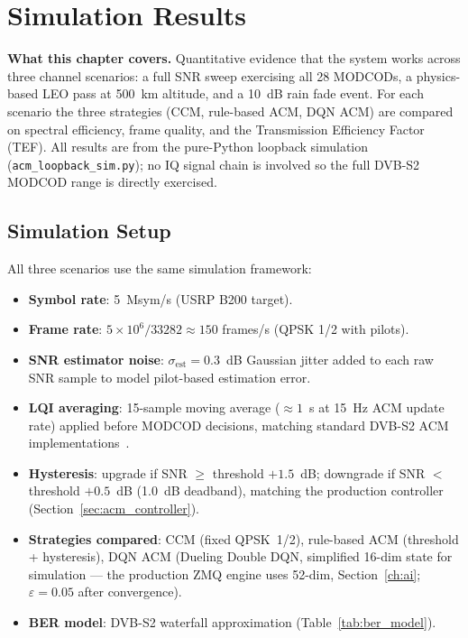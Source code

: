 \documentclass[12pt,a4paper]{report}
\begin{document}
\chapter{Simulation Results}

\begin{keyinsight}
\textbf{What this chapter covers.}
Quantitative evidence that the system works across three channel scenarios:
a full SNR sweep exercising all 28 MODCODs, a physics-based LEO pass at 500~km
altitude, and a 10~dB rain fade event.  For each scenario the three strategies
(CCM, rule-based ACM, DQN ACM) are compared on spectral efficiency, frame
quality, and the Transmission Efficiency Factor (TEF).  All results are from
the pure-Python loopback simulation (\texttt{acm\_loopback\_sim.py}); no IQ
signal chain is involved so the full DVB-S2 MODCOD range is directly exercised.
\end{keyinsight}

\section{Simulation Setup}

All three scenarios use the same simulation framework:
\begin{itemize}
  \item \textbf{Symbol rate}: 5~Msym/s (USRP B200 target).
  \item \textbf{Frame rate}: $5\times10^6 / 33282 \approx 150$ frames/s
        (QPSK 1/2 with pilots).
  \item \textbf{SNR estimator noise}: $\sigma_{\text{est}} = 0.3$~dB Gaussian
        jitter added to each raw SNR sample to model pilot-based estimation error.
  \item \textbf{LQI averaging}: 15-sample moving average ($\approx 1$~s at
        15~Hz ACM update rate) applied before MODCOD decisions, matching
        standard DVB-S2 ACM implementations~\cite{bischl2010}.
  \item \textbf{Hysteresis}: upgrade if SNR $\geq$ threshold $+1.5$~dB;
        downgrade if SNR $<$ threshold $+0.5$~dB (1.0~dB deadband),
        matching the production controller (Section~\ref{sec:acm_controller}).
  \item \textbf{Strategies compared}: CCM (fixed QPSK~1/2), rule-based ACM
        (threshold + hysteresis), DQN ACM (Dueling Double DQN, simplified
        16-dim state for simulation — the production ZMQ engine uses 52-dim,
        Section~\ref{ch:ai}; $\varepsilon = 0.05$ after convergence).
  \item \textbf{BER model}: DVB-S2 waterfall approximation
        (Table~\ref{tab:ber_model}).
\end{itemize}
\end{document}
